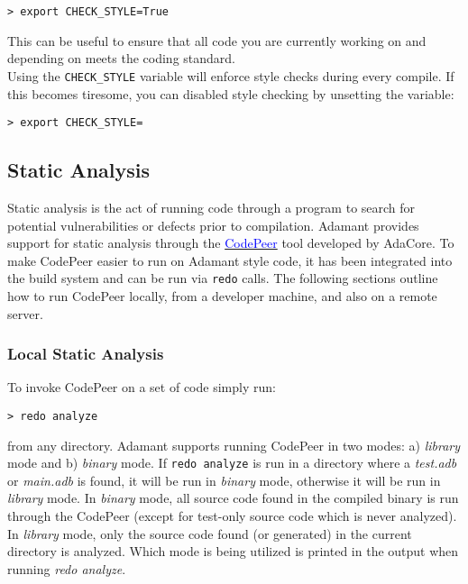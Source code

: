 \vspace{5mm} %
\begin{verbatim}
> export CHECK_STYLE=True
\end{verbatim}
\vspace{5mm} %

This can be useful to ensure that all code you are currently working on and depending on meets the coding standard. \\

Using the \texttt{CHECK\_STYLE} variable will enforce style checks during every compile. If this becomes tiresome, you can disabled style checking by unsetting the variable:

\vspace{5mm} %
\begin{verbatim}
> export CHECK_STYLE=
\end{verbatim}
\vspace{5mm} %

\subsection{Static Analysis} \label{Static Analysis}

Static analysis is the act of running code through a program to search for potential vulnerabilities or defects prior to compilation. Adamant provides support for static analysis through the \href{https://docs.adacore.com/codepeer-docs/users_guide/_build/html/index.html}{\textcolor{blue}{CodePeer}} tool developed by AdaCore. To make CodePeer easier to run on Adamant style code, it has been integrated into the build system and can be run via \texttt{redo} calls. The following sections outline how to run CodePeer locally, from a developer machine, and also on a remote server.

\subsubsection{Local Static Analysis}

To invoke CodePeer on a set of code simply run:

\vspace{5mm} %
\begin{verbatim}
> redo analyze
\end{verbatim}
\vspace{5mm} %

from any directory. Adamant supports running CodePeer in two modes: a) \textit{library} mode and b) \textit{binary} mode. If \texttt{redo analyze} is run in a directory where a \textit{test.adb} or \textit{main.adb} is found, it will be run in \textit{binary} mode, otherwise it will be run in \textit{library} mode. In \textit{binary} mode, all source code found in the compiled binary is run through the CodePeer (except for test-only source code which is never analyzed). In \textit{library} mode, only the source code found (or generated) in the current directory is analyzed. Which mode is being utilized is printed in the output when running \textit{redo analyze}. \\

